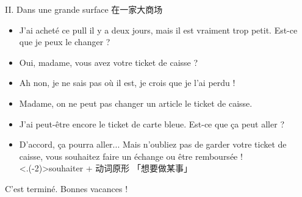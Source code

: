 \documentclass[french, aspectratio=169, 14pt, handout]{beamer}
\newcommand{\red}[1]{\textcolor{red}{#1}} %
\begin{document}
\begin{CJK*}{UTF8}{gkai}
\begin{frame}{II. Dans une grande surface 在一家大商场}
\begin{itemize}
	\item J'ai acheté ce pull \alert<+>{il y a deux jours}, mais il est vraiment \alert<+>{trop} petit. Est-ce que \alert<+>{je peux le changer} ?
	\item Oui, madame, vous avez votre \alert<+>{ticket de caisse} ?
	\item Ah non, \alert<+>{je ne sais pas} où il est, \alert<+>{je crois} que \alert<+>{je l’ai perdu} ! \pause
	\item Madame, \alert<+>{on ne peut pas changer} un article \alt<+>{\red{sans} (没有)}{sans} le ticket de caisse.  \pause
	\item J’ai peut-être encore le \alert<+>{ticket de carte bleue}. Est-ce que \alert<+>{ça peut aller} ? \pause
	\item D’accord, ça pourra aller...  \pause Mais \alert<+>{n'oubliez pas de garder} votre ticket de caisse, \alt<+>{\red{si} (如果)}{si} vous \alert<+>{souhaitez} \alert<+>{faire un échange} ou \alert<+>{être remboursée} !  \\
	\visible<.(-2)>{souhaiter + 动词原形 「想要做某事」}
\end{itemize}
\end{frame}

\begin{frame}{}
\huge{\centerline{C'est terminé. Bonnes vacances !}}
\end{frame}

\end{CJK*}
\end{document}
